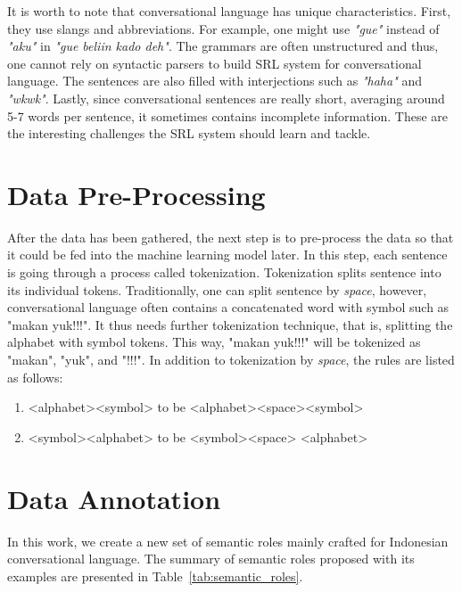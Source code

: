 It is worth to note that conversational language has unique characteristics. First, they use slangs and abbreviations. For example, one might use \textit{"gue"} instead of \textit{"aku"} in \textit{"gue beliin kado deh"}. The grammars are often unstructured and thus, one cannot rely on syntactic parsers to build SRL system for conversational language. The sentences are also filled with interjections such as \textit{"haha"} and \textit{"wkwk"}. Lastly, since conversational sentences are really short, averaging around 5-7 words per sentence, it sometimes contains incomplete information. These are the interesting challenges the SRL system should learn and tackle.

\section{Data Pre-Processing}
After the data has been gathered, the next step is to pre-process the data so that it could be fed into the machine learning model later. In this step, each sentence is going through a process called tokenization. Tokenization splits sentence into its individual tokens. Traditionally, one can split sentence by \textit{space}, however, conversational language often contains a concatenated word with symbol such as "makan yuk!!!". It thus needs further tokenization technique, that is, splitting the alphabet with symbol tokens. This way, "makan yuk!!!" will be tokenized as "makan", "yuk", and "!!!". In addition to tokenization by \textit{space}, the rules are listed as follows:
\begin{enumerate}
	\item <alphabet><symbol> to be <alphabet><space><symbol>
	\item <symbol><alphabet> to be <symbol><space> <alphabet>
\end{enumerate}

\section{Data Annotation}
In this work, we create a new set of semantic roles mainly crafted for Indonesian conversational language. The summary of semantic roles proposed with its examples are presented in Table~\ref{tab:semantic_roles}.

